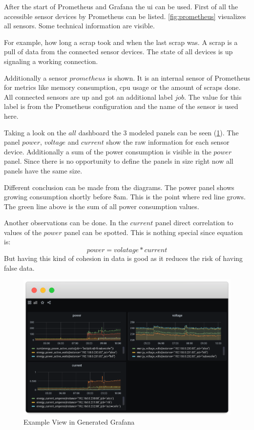 After the start of Prometheus and Grafana the \gls{ui} can be used. First of all the accessible sensor devices by Prometheus can be listed. \cref{fig:prometheus} visualizes all sensors. Some technical information are visible. 

For example, how long a scrap took and when the last scrap was. A scrap is a pull of data from the connected sensor devices. The state of all devices is up signaling a working connection. 

Additionally a sensor $prometheus$ is shown. It is an internal sensor of Prometheus for metrics like memory consumption, \gls{cpu} usage or the amount of scraps done. All connected sensors are up and got an additional label $job$. The value for this label is from the Prometheus configuration and the name of the sensor is used here.


Taking a look on the $all$ dashboard the 3 modeled panels can be seen (\cref{fig:grafana}). The panel $power$, $voltage$ and $current$ show the raw information for each sensor device. Additionally a sum of the power consumption is visible in the $power$ panel. Since there is no opportunity to define the panels in size right now all panels have the same size. 

Different conclusion can be made from the diagrams. The power panel shows growing consumption shortly before 8am. This is the point where red line grows. The green line above is the sum of all power consumption values. 

Another observations can be done. In the $current$ panel direct correlation to values of the $power$ panel can be spotted. This is nothing special since equation is:
\begin{equation*}
power = volatage * current
\end{equation*}
But having this kind of cohesion in data is good as it reduces the risk of having false data. 


\begin{figure}[!ht]
	\includegraphics[width=\linewidth]{assets/images/dashboard_all}
	\caption{Example View in Generated Grafana}
	\label{fig:grafana}
\end{figure}